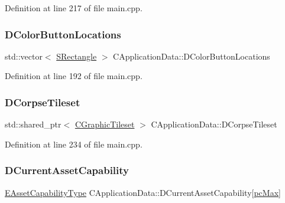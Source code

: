 Definition at line 217 of file main.\+cpp.

\hypertarget{classCApplicationData_ac983034ed6e3eec382e22f1d2af25106}{}\label{classCApplicationData_ac983034ed6e3eec382e22f1d2af25106} 
\subsubsection{\texorpdfstring{D\+Color\+Button\+Locations}{DColorButtonLocations}}
{\footnotesize\ttfamily std\+::vector$<$ \hyperlink{structSRectangle}{S\+Rectangle} $>$ C\+Application\+Data\+::\+D\+Color\+Button\+Locations\hspace{0.3cm}{\ttfamily [protected]}}



Definition at line 192 of file main.\+cpp.

\hypertarget{classCApplicationData_aec983aa995cdb449344422d607fe0228}{}\label{classCApplicationData_aec983aa995cdb449344422d607fe0228} 
\subsubsection{\texorpdfstring{D\+Corpse\+Tileset}{DCorpseTileset}}
{\footnotesize\ttfamily std\+::shared\+\_\+ptr$<$ \hyperlink{classCGraphicTileset}{C\+Graphic\+Tileset} $>$ C\+Application\+Data\+::\+D\+Corpse\+Tileset\hspace{0.3cm}{\ttfamily [protected]}}



Definition at line 234 of file main.\+cpp.

\hypertarget{classCApplicationData_a7e0dbfdc54f73dfa9838ae81b8017e2d}{}\label{classCApplicationData_a7e0dbfdc54f73dfa9838ae81b8017e2d} 
\subsubsection{\texorpdfstring{D\+Current\+Asset\+Capability}{DCurrentAssetCapability}}
{\footnotesize\ttfamily \hyperlink{GameDataTypes_8h_a35b98ce26aca678b03c6f9f76e4778ce}{E\+Asset\+Capability\+Type} C\+Application\+Data\+::\+D\+Current\+Asset\+Capability\mbox{[}\hyperlink{GameDataTypes_8h_aafb0ca75933357ff28a6d7efbdd7602fa594a5c8dd3987f24e8a0f23f1a72cd34}{pc\+Max}\mbox{]}\hspace{0.3cm}{\ttfamily [protected]}}




